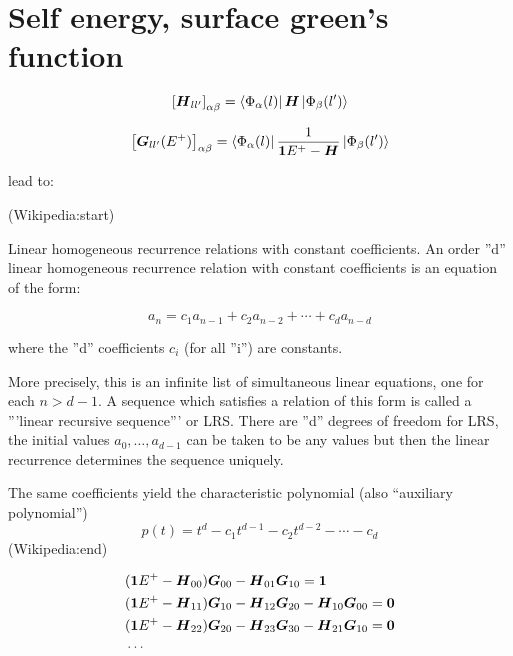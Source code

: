 
\author{Jonas Siegl}
\setlength{\jot}{10pt}

\section{Self energy, surface green's function}
\begin{equation}
	\left[\boldsymbol{H}_{ll'}\right]_{\alpha\beta} = \left< \Phi_\alpha(l) \right|\boldsymbol{H}\left| \Phi_\beta(l') \right>
	\label{Hmatrixelements}
\end{equation}

\begin{equation}
	\left[ \boldsymbol{G}_{ll'}(E^+) \right]_{\alpha\beta} = \left< \Phi_\alpha(l) \right|\frac{1}{\boldsymbol{1}E^+-\boldsymbol{H}}\left| \Phi_\beta(l') \right>
	\label{Gmatrixelements}
\end{equation}

lead  to:

(Wikipedia:start)

Linear homogeneous recurrence relations with constant coefficients.
An order ''d'' linear homogeneous recurrence relation with constant coefficients  is an equation of the form:

\begin{equation}
	a_n = c_1a_{n-1} + c_2a_{n-2}+\cdots+c_da_{n-d} 
	\label{linearrecformula}
\end{equation}

where the ''d'' coefficients $c_i$ (for all ''i'') are constants.

More precisely, this is an infinite list of simultaneous linear equations, one for each $n> d-1$. A sequence which satisfies a relation of this form is called a '''linear recursive sequence''' or LRS. There are ''d'' degrees of freedom for LRS, the initial values $a_0,\dots,a_{d-1}$ can be taken to be any values but then the linear recurrence determines the sequence uniquely.

The same coefficients yield the characteristic polynomial (also ``auxiliary polynomial'')
\begin{equation}
	p(t)= t^d - c_1t^{d-1} - c_2t^{d-2}-\cdots-c_{d}
	\label{charactersitic polynomial}
\end{equation}
(Wikipedia:end)

\begin{align}
	&(\boldsymbol{1}E^+-\boldsymbol{H}_{00})\boldsymbol{G}_{00}-\boldsymbol{H}_{01}\boldsymbol{G}_{10}=\boldsymbol{1}\nonumber \\
	&(\boldsymbol{1}E^+-\boldsymbol{H}_{11})\boldsymbol{G}_{10}-\boldsymbol{H}_{12}\boldsymbol{G}_{20}-\boldsymbol{H}_{10}\boldsymbol{G}_{00}=\boldsymbol{0}\\
	&(\boldsymbol{1}E^+-\boldsymbol{H}_{22})\boldsymbol{G}_{20}-\boldsymbol{H}_{23}\boldsymbol{G}_{30}-\boldsymbol{H}_{21}\boldsymbol{G}_{10}=\boldsymbol{0}\nonumber \\
	&\cdots\nonumber
	\label{LRS}
\end{align}

